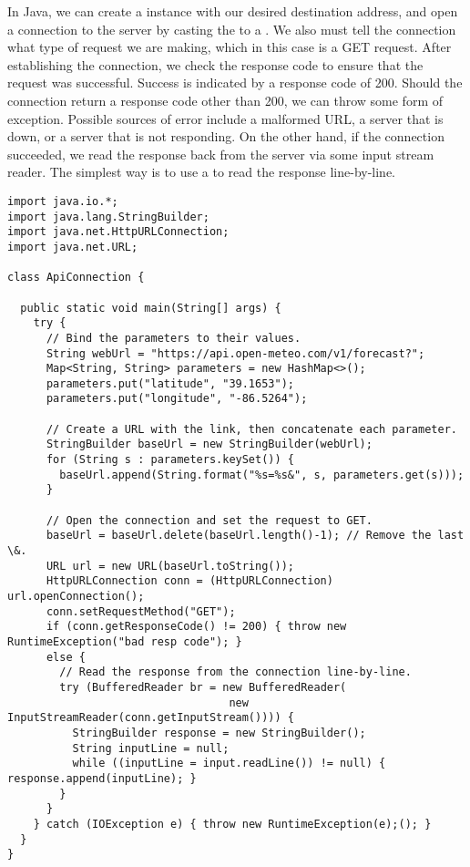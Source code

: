 In Java, we can create a  instance with our desired destination address, and open a connection to the server by casting the  to a . 
We also must tell the connection what type of request we are making, which in this case is a GET request. 
After establishing the connection, we check the response code to ensure that the request was successful. 
Success is indicated by a response code of 200. 
Should the connection return a response code other than 200, we can throw some form of exception. 
Possible sources of error include a malformed URL, a server that is down, or a server that is not responding.
On the other hand, if the connection succeeded, we read the response back from the server via some input stream reader. 
The simplest way is to use a  to read the response line-by-line.

\enlargethispage{2\baselineskip}
\begin{lstlisting}[language=MyJava]
import java.io.*;
import java.lang.StringBuilder;
import java.net.HttpURLConnection;
import java.net.URL;

class ApiConnection {

  public static void main(String[] args) {
    try {
      // Bind the parameters to their values.
      String webUrl = "https://api.open-meteo.com/v1/forecast?";
      Map<String, String> parameters = new HashMap<>();
      parameters.put("latitude", "39.1653");
      parameters.put("longitude", "-86.5264");

      // Create a URL with the link, then concatenate each parameter.
      StringBuilder baseUrl = new StringBuilder(webUrl);
      for (String s : parameters.keySet()) { 
        baseUrl.append(String.format("%s=%s&", s, parameters.get(s))); 
      }
    
      // Open the connection and set the request to GET.
      baseUrl = baseUrl.delete(baseUrl.length()-1); // Remove the last \&.
      URL url = new URL(baseUrl.toString());
      HttpURLConnection conn = (HttpURLConnection) url.openConnection();
      conn.setRequestMethod("GET");
      if (conn.getResponseCode() != 200) { throw new RuntimeException("bad resp code"); } 
      else {
        // Read the response from the connection line-by-line.
        try (BufferedReader br = new BufferedReader(
                                  new InputStreamReader(conn.getInputStream()))) {
          StringBuilder response = new StringBuilder();
          String inputLine = null;
          while ((inputLine = input.readLine()) != null) { response.append(inputLine); }
        }
      }
    } catch (IOException e) { throw new RuntimeException(e);(); }
  }
}
\end{lstlisting}

